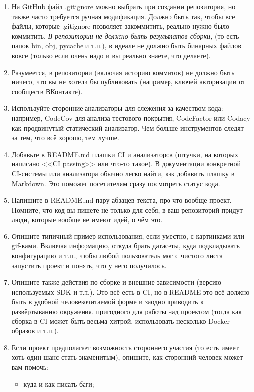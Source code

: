 \documentclass[a5paper]{article}
\begin{document}
\begin{enumerate}
\begin{itemize}
    \end{itemize}
    \item На GitHub файл .gitignore можно выбрать при создании репозитория, но также часто требуется ручная модификация. Должно быть так, чтобы все файлы, которые .gitignore позволяет закоммитить, реально нужно было коммитить. \emph{В репозитории не должно быть результатов сборки,} (то есть папок bin, obj, pycache и т.п.), в идеале не должно быть бинарных файлов вовсе (только если очень надо и вы реально знаете, что делаете).
    \item Разумеется, в репозитории (включая историю коммитов) не должно быть ничего, что вы не хотели бы публиковать (например, ключей авторизации от сообществ ВКонтакте).
    \item Используйте сторонние анализаторы для слежения за качеством кода: например, CodeCov для анализа тестового покрытия, CodeFactor или Codacy как продвинутый статический анализатор. Чем больше инструментов следят за тем, что всё хорошо, тем лучше.
    \item Добавьте в README.md плашки CI и анализаторов (штучки, на которых написано <<CI passing>> или что-то такое). В документации конкретной CI-системы или анализатора обычно легко найти, как добавить плашку в Markdown. Это поможет посетителям сразу посмотреть статус кода.
    \item Напишите в README.md пару абзацев текста, про что вообще проект. Помните, что код вы пишете не только для себя, в ваш репозиторий придут люди, которые вообще не имеют идей, о чём это.
    \item Опишите типичный пример использования, если уместно, с картинками или gif-ками. Включая информацию, откуда брать датасеты, куда подкладывать конфигурацию и т.п., чтобы любой пользователь мог с чистого листа запустить проект и понять, что у него получилось.
    \item Опишите также действия по сборке и внешние зависимости (версию используемых SDK и т.п.). Это всё есть в CI, но в README это всё должно быть в удобной человекочитаемой форме и заодно приводить к развёртыванию окружения, пригодного для работы над проектом (тогда как сборка в CI может быть весьма хитрой, использовать несколько Docker-образов и т.п.).
    \item Если проект предполагает возможность стороннего участия (то есть имеет хоть один шанс стать знаменитым), опишите, как сторонний человек может вам помочь:
    \begin{itemize}
        \item куда и как писать баги;

\end{itemize}
\end{enumerate}
\end{document}
